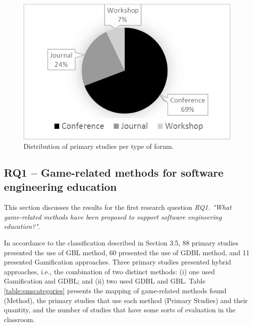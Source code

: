 \begin{figure}[!h]%
\centering
\includegraphics{img/smsForum.png}
\caption{Distribution of primary studies per type of forum.}
\label{fig:smsforum}
\end{figure} 



\subsection{RQ1 – Game-related methods for software engineering education}
\label{sec:smsrq1}

This section discusses the results for the first research question  \textit{RQ1. "What game-related methods have been proposed to support software engineering education?"}.

In accordance to the classification described in Section 3.5, 88 primary studies presented the use of GBL method, 60 presented the use of GDBL method, and 11 presented Gamification approaches. Three primary studies presented hybrid approaches, i.e., the combination of two distinct methods: (i) one used Gamification and GDBL; and (ii) two used GDBL and GBL. Table \ref{table:smscategories} presents the mapping of game-related methods found (Method), the primary studies that use each method (Primary Studies) and their quantity, and the number of studies that have some sorts of evaluation in the classroom.
 


